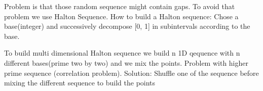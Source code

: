 Problem is that those random sequence might contain gaps.\newline
To avoid that problem we use Halton Sequence.\newline
How to build a Halton sequence:\newline
Chose a base(integer) and successively decompose [0, 1] in subintervals according to the base.\newline

To build multi dimensional Halton sequence we build n 1D qequence with n different bases(prime two by two) and we mix the points.\newline
Problem with higher prime sequence (correlation problem).\newline
Solution:\newline
Shuffle one of the sequence before mixing the different sequence to build the points
